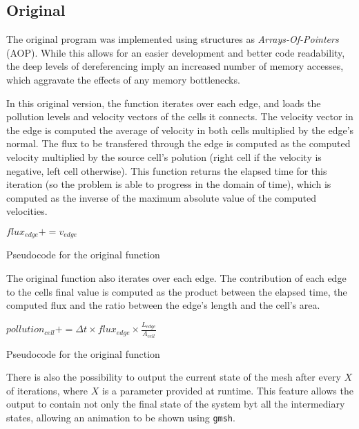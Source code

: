 \subsection{Original}
\label{sec:original}

The original \polu program was implemented using structures as \textit{Arrays-Of-Pointers} (AOP). While this allows for an easier development and better code readability, the deep levels of dereferencing imply an increased number of memory accesses, which aggravate the effects of any memory bottlenecks.

In this original version, the \computeflux function iterates over each edge, and loads the pollution levels and velocity vectors of the cells it connects. The velocity vector in the edge is computed the average of velocity in both cells multiplied by the edge's normal. The flux to be transfered through the edge is computed as the computed velocity multiplied by the source cell's polution (right cell if the velocity is negative, left cell otherwise). This function returns the elapsed time for this iteration (so the problem is able to progress in the domain of time), which is computed as the inverse of the maximum absolute value of the computed velocities.

\begin{algorithm}
	\begin{algorithmic}


				$flux_{edge} += v_{edge}$
		\EndFor
	\end{algorithmic}

	\caption{Pseudocode for the original \computeflux function}
	\label{alg:update}
\end{algorithm}

The original \update function also iterates over each edge. The contribution of each edge to the cells final value is computed as the product between the elapsed time, the computed flux and the ratio between the edge's length and the cell's area.

\begin{algorithm}
	\begin{algorithmic}
		\ForAll {$cell \in Cells$}
			\ForAll {$edge \in Edges_{cell}$}

				$pollution_{cell} += \Delta{t} \times flux_{edge} \times \frac{L_{edge}}{A_{cell}}$
			\EndFor
		\EndFor
	\end{algorithmic}

	\caption{Pseudocode for the original \update function}
	\label{alg:update}
\end{algorithm}

There is also the possibility to output the current state of the mesh after every $X$ of iterations, where $X$ is a parameter provided at runtime. This feature allows the output to contain not only the final state of the system byt all the intermediary states, allowing  an animation to be shown using \texttt{gmsh}.



